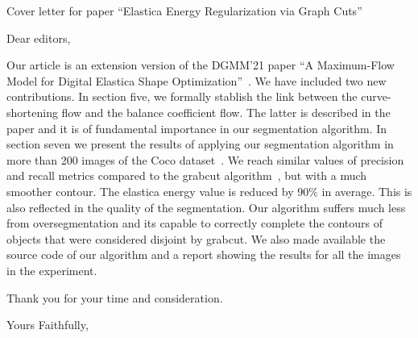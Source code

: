 \documentclass{letter}
\begin{document}
\begin{letter}{Cover letter for paper ``Elastica Energy Regularization via Graph Cuts''}
\opening{Dear editors,}

Our article is an extension version of the DGMM'21 paper ``A Maximum-Flow Model
for Digital Elastica Shape Optimization''~\cite{antunes21}. We have included 
two new contributions. In section five, we formally stablish the link between 
the curve-shortening flow and the balance coefficient flow. The latter is described 
in the paper and it is of fundamental importance in our segmentation algorithm. 
In section seven we present the results of applying our segmentation algorithm 
in more than 200 images of the Coco dataset~\cite{lin2014microsoft}. We reach similar values of 
precision and recall metrics compared to the grabcut algorithm~\cite{rother04grabcut}, but with
a much smoother contour. The elastica energy value is reduced by $90\%$ in average.
This is also reflected in the quality of the segmentation. Our algorithm suffers 
much less from oversegmentation and its capable to correctly complete the contours
of objects that were considered disjoint by grabcut. We also made available the source code of
our algorithm and a report showing the results for all the images in the experiment.

Thank you for your time and consideration.

\closing{Yours Faithfully,}




\end{letter}


\end{document}
